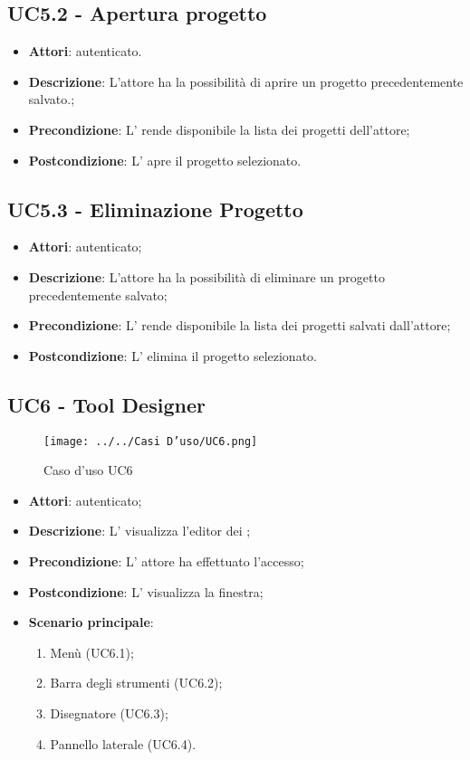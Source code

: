 \subsection{UC5.2 - Apertura progetto}
\label{ssec:UC5.2}
\begin{itemize}
\item \textbf{Attori}:  autenticato.
\item \textbf{Descrizione}: L’attore ha la possibilità di aprire un progetto precedentemente salvato.;
\item \textbf{Precondizione}: L’ rende disponibile la lista dei progetti dell'attore;
\item \textbf{Postcondizione}: L’ apre il progetto selezionato.
\end{itemize}
\subsection{UC5.3 - Eliminazione Progetto}
\label{ssec:UC5.3}
\begin{itemize}
\item \textbf{Attori}:  autenticato;
\item \textbf{Descrizione}: L'attore ha la possibilità di eliminare un progetto precedentemente salvato;
\item \textbf{Precondizione}: L’ rende disponibile la lista dei progetti salvati dall'attore;
\item \textbf{Postcondizione}: L’ elimina il progetto selezionato.
\end{itemize}
\newpage
\subsection{UC6 - Tool Designer}
\label{ssec:UC6}
\begin{figure}[h!]
\centering
\texttt{[image: ../../Casi D'uso/UC6.png]}
\caption{Caso d'uso UC6}
 \end{figure}
\begin{itemize}
\item \textbf{Attori}:  autenticato;
\item \textbf{Descrizione}: L' visualizza l'editor dei ;
\item \textbf{Precondizione}: L' attore ha effettuato l'accesso;
\item \textbf{Postcondizione}: L' visualizza la finestra;
\item \textbf{Scenario principale}: \begin{enumerate}\item Menù (UC6.1);\item Barra degli strumenti (UC6.2);\item Disegnatore  (UC6.3);\item Pannello laterale (UC6.4).
 \end{enumerate}
\end{itemize}
\newpage
